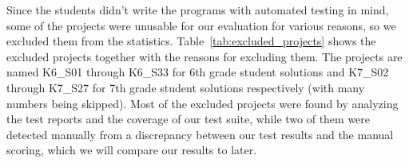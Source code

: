 Since the students didn't write the programs with automated testing in mind,
some of the projects were unusable for our evaluation for various reasons, so we excluded them from the statistics.
Table~\ref{tab:excluded_projects} shows the excluded projects together with the reasons for excluding them.
The projects are named K6\_S01 through K6\_S33 for 6th grade student solutions
and K7\_S02 through K7\_S27 for 7th grade student solutions respectively (with many numbers being skipped).
Most of the excluded projects were found by analyzing the test reports and the coverage of our test suite,
while two of them were detected manually from a discrepancy between our test results and the manual scoring,
which we will compare our results to later.


